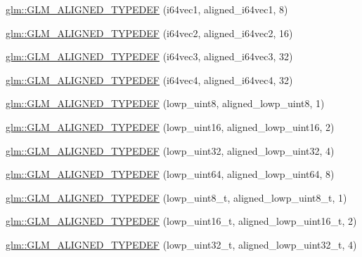 \begin{DoxyCompactItemize}
\item 
\hyperlink{group__gtx__type__aligned_ga965b1c9aa1800e93d4abc2eb2b5afcbf}{glm\+::\+G\+L\+M\+\_\+\+A\+L\+I\+G\+N\+E\+D\+\_\+\+T\+Y\+P\+E\+D\+E\+F} (i64vec1, aligned\+\_\+i64vec1, 8)
\item 
\hyperlink{group__gtx__type__aligned_ga1f9e9c2ea2768675dff9bae5cde2d829}{glm\+::\+G\+L\+M\+\_\+\+A\+L\+I\+G\+N\+E\+D\+\_\+\+T\+Y\+P\+E\+D\+E\+F} (i64vec2, aligned\+\_\+i64vec2, 16)
\item 
\hyperlink{group__gtx__type__aligned_gad77c317b7d942322cd5be4c8127b3187}{glm\+::\+G\+L\+M\+\_\+\+A\+L\+I\+G\+N\+E\+D\+\_\+\+T\+Y\+P\+E\+D\+E\+F} (i64vec3, aligned\+\_\+i64vec3, 32)
\item 
\hyperlink{group__gtx__type__aligned_ga716f8ea809bdb11b5b542d8b71aeb04f}{glm\+::\+G\+L\+M\+\_\+\+A\+L\+I\+G\+N\+E\+D\+\_\+\+T\+Y\+P\+E\+D\+E\+F} (i64vec4, aligned\+\_\+i64vec4, 32)
\item 
\hyperlink{group__gtx__type__aligned_gad46f8e9082d5878b1bc04f9c1471cdaa}{glm\+::\+G\+L\+M\+\_\+\+A\+L\+I\+G\+N\+E\+D\+\_\+\+T\+Y\+P\+E\+D\+E\+F} (lowp\+\_\+uint8, aligned\+\_\+lowp\+\_\+uint8, 1)
\item 
\hyperlink{group__gtx__type__aligned_ga1246094581af624aca6c7499aaabf801}{glm\+::\+G\+L\+M\+\_\+\+A\+L\+I\+G\+N\+E\+D\+\_\+\+T\+Y\+P\+E\+D\+E\+F} (lowp\+\_\+uint16, aligned\+\_\+lowp\+\_\+uint16, 2)
\item 
\hyperlink{group__gtx__type__aligned_ga7a5009a1d0196bbf21dd7518f61f0249}{glm\+::\+G\+L\+M\+\_\+\+A\+L\+I\+G\+N\+E\+D\+\_\+\+T\+Y\+P\+E\+D\+E\+F} (lowp\+\_\+uint32, aligned\+\_\+lowp\+\_\+uint32, 4)
\item 
\hyperlink{group__gtx__type__aligned_ga45213fd18b3bb1df391671afefe4d1e7}{glm\+::\+G\+L\+M\+\_\+\+A\+L\+I\+G\+N\+E\+D\+\_\+\+T\+Y\+P\+E\+D\+E\+F} (lowp\+\_\+uint64, aligned\+\_\+lowp\+\_\+uint64, 8)
\item 
\hyperlink{group__gtx__type__aligned_ga0ba26b4e3fd9ecbc25358efd68d8a4ca}{glm\+::\+G\+L\+M\+\_\+\+A\+L\+I\+G\+N\+E\+D\+\_\+\+T\+Y\+P\+E\+D\+E\+F} (lowp\+\_\+uint8\+\_\+t, aligned\+\_\+lowp\+\_\+uint8\+\_\+t, 1)
\item 
\hyperlink{group__gtx__type__aligned_gaf2b58f5fb6d4ec8ce7b76221d3af43e1}{glm\+::\+G\+L\+M\+\_\+\+A\+L\+I\+G\+N\+E\+D\+\_\+\+T\+Y\+P\+E\+D\+E\+F} (lowp\+\_\+uint16\+\_\+t, aligned\+\_\+lowp\+\_\+uint16\+\_\+t, 2)
\item 
\hyperlink{group__gtx__type__aligned_gadc246401847dcba155f0699425e49dcd}{glm\+::\+G\+L\+M\+\_\+\+A\+L\+I\+G\+N\+E\+D\+\_\+\+T\+Y\+P\+E\+D\+E\+F} (lowp\+\_\+uint32\+\_\+t, aligned\+\_\+lowp\+\_\+uint32\+\_\+t, 4)

\end{DoxyCompactItemize}
